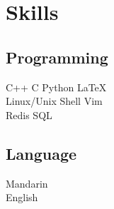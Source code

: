 \documentclass[]{deedy-resume-openfont}
\begin{document}
\begin{minipage}[t]{0.25\textwidth}

\section{Skills}
\sectionsep
\subsection{Programming}
C++ \textbullet{} C \textbullet{} Python \textbullet{} \LaTeX \\
Linux/Unix \textbullet{} Shell \textbullet{} Vim \\
Redis \textbullet{} SQL \\ 
\sectionsep

\subsection{Language}
Mandarin \\
English \\

%
%

\end{minipage} 
\hfill
\end{document}
